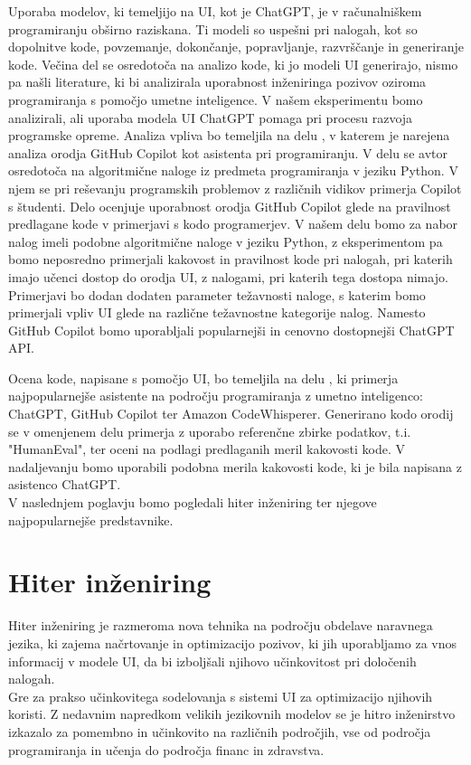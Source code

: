 \documentclass[a4paper,12pt,openright]{book}
\begin{document}
Uporaba modelov, ki temeljijo na UI, kot je ChatGPT, je v računalniškem programiranju obširno raziskana. Ti modeli so uspešni pri nalogah, kot so dopolnitve kode, povzemanje, dokončanje, popravljanje, razvrščanje in generiranje kode. \cite{rudolph2023war} Večina del se osredotoča na analizo kode, ki jo modeli UI generirajo, nismo pa našli literature, ki bi analizirala uporabnost inženiringa pozivov oziroma programiranja s pomočjo umetne inteligence. V našem eksperimentu bomo analizirali, ali uporaba modela UI ChatGPT pomaga pri procesu razvoja programske opreme.
\newline
Analiza vpliva bo temeljila na delu \cite{MORADIDAKHEL2023111734}, v katerem je narejena analiza orodja GitHub Copilot kot asistenta pri programiranju. V delu se avtor osredotoča na algoritmične naloge iz predmeta programiranja v jeziku Python. V njem se pri reševanju programskih problemov z različnih vidikov primerja Copilot s študenti. Delo ocenjuje uporabnost orodja GitHub Copilot glede na pravilnost predlagane kode v primerjavi s kodo programerjev.
V našem delu bomo za nabor nalog imeli podobne algoritmične naloge v jeziku Python, z eksperimentom pa bomo neposredno primerjali kakovost in pravilnost kode pri nalogah, pri katerih imajo učenci dostop do orodja UI, z nalogami, pri katerih tega dostopa nimajo. Primerjavi bo dodan dodaten parameter težavnosti naloge, s katerim bomo primerjali vpliv UI glede na različne težavnostne kategorije nalog. Namesto GitHub Copilot bomo uporabljali popularnejši in cenovno dostopnejši ChatGPT API. 

Ocena kode, napisane s pomočjo UI, bo temeljila na delu \cite{yetistiren2023evaluating}, ki primerja najpopularnejše asistente na področju programiranja z umetno inteligenco: ChatGPT, GitHub Copilot ter Amazon CodeWhisperer. Generirano kodo orodij se v omenjenem delu primerja z uporabo referenčne zbirke podatkov, t.i. "HumanEval", ter oceni na podlagi predlaganih meril kakovosti kode. V nadaljevanju bomo uporabili podobna merila kakovosti kode, ki je bila napisana z asistenco ChatGPT. \cite{7577432} \\
V naslednjem poglavju bomo pogledali hiter inženiring ter njegove najpopularnejše predstavnike.


\chapter{Hiter inženiring}

Hiter inženiring je razmeroma nova tehnika na področju obdelave naravnega jezika, ki zajema načrtovanje in optimizacijo pozivov, ki jih uporabljamo za vnos informacij v modele UI, da bi izboljšali njihovo učinkovitost pri določenih nalogah. \cite{wang2024prompt} \\
Gre za prakso učinkovitega sodelovanja s sistemi UI za optimizacijo njihovih koristi. Z nedavnim napredkom velikih jezikovnih modelov se je hitro inženirstvo izkazalo za pomembno in učinkovito na različnih področjih, vse od področja programiranja in učenja do področja financ in zdravstva. \cite{info:doi/10.2196/50638} \\
\end{document}
